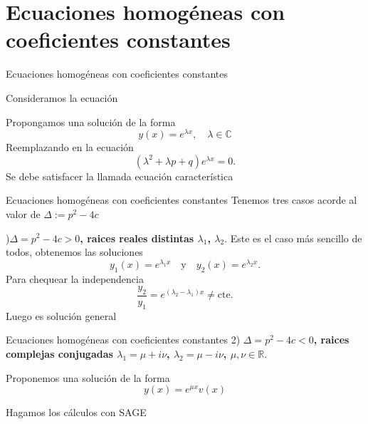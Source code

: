 \documentclass[handout,hyperref={colorlinks=true}]{beamer}
\newcommand{\rr}{\mathbb{R}}
\renewcommand{\emph}[1]{\textcolor[rgb]{1,0,0}{#1}}
\newcommand{\nl}{\onslide<+-> }
\begin{document}
 \section{Ecuaciones homogéneas con coeficientes constantes}
\begin{frame}{Ecuaciones homogéneas con coeficientes constantes}
 
 Consideramos la ecuación
 
 \boxedeq{y''+py'+qy=0,\quad p,q\in\rr}\label{2orden_coef_ctes}
    
 Propongamos una solución de la forma 
 \[\boxed{y(x)=e^{\lambda x},\quad \lambda\in\mathbb{C}}\]
 Reemplazando en la ecuación
 \[(\lambda^2+\lambda p+q)e^{\lambda x}=0.\]
Se debe satisfacer la llamada \emph{ecuación característica}
\end{frame}

\begin{frame}{Ecuaciones homogéneas con coeficientes constantes}
Tenemos tres casos acorde al valor de $\Delta:=p^2-4c$

\nl 1)\textbf{$\boxed{\Delta=p^2-4c>0}$, raices reales distintas $\lambda_1$, $\lambda_2$}. Este es el caso más sencillo de todos, obtenemos las soluciones
\[y_1(x)=e^{\lambda_1 x}\quad\text{y}\quad y_2(x)=e^{\lambda_2 x}.\]
Para chequear la independencia
\[\frac{y_2}{y_1}=e^{(\lambda_2-\lambda_1)x}\neq\text{cte}.\]
Luego 
es solución general
\end{frame}

\begin{frame}{Ecuaciones homogéneas con coeficientes constantes}
2) \textbf{$\boxed{\Delta=p^2-4c<0}$, raices complejas conjugadas $\lambda_1=\mu+i\nu$, $\lambda_2=\mu-i\nu$, $\mu,\nu\in\rr$}.

Proponemos una solución de la forma
\[
 y(x)=e^{\mu x}v(x)
\]

Hagamos los cálculos con SAGE
 



\end{frame}

\end{document}
